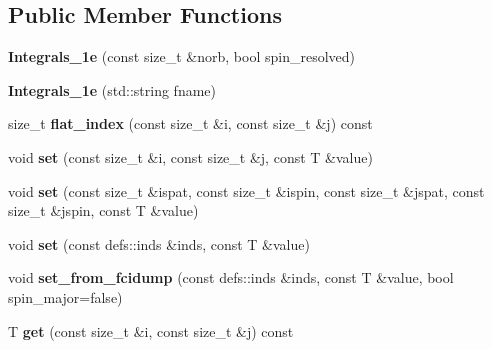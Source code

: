 \subsection*{Public Member Functions}
\begin{DoxyCompactItemize}
\item 
{\bfseries Integrals\+\_\+1e} (const size\+\_\+t \&norb, bool spin\+\_\+resolved)\hypertarget{classIntegrals__1e_a639a4a9f4b1688a96e1d021ad7e38b66}{}\label{classIntegrals__1e_a639a4a9f4b1688a96e1d021ad7e38b66}

\item 
{\bfseries Integrals\+\_\+1e} (std\+::string fname)\hypertarget{classIntegrals__1e_af0f4537e1f148e5c2dbbfc5f252b21a5}{}\label{classIntegrals__1e_af0f4537e1f148e5c2dbbfc5f252b21a5}

\item 
size\+\_\+t {\bfseries flat\+\_\+index} (const size\+\_\+t \&i, const size\+\_\+t \&j) const \hypertarget{classIntegrals__1e_a76f25fd3451dda2ab8c66b7839bc5eb2}{}\label{classIntegrals__1e_a76f25fd3451dda2ab8c66b7839bc5eb2}

\item 
void {\bfseries set} (const size\+\_\+t \&i, const size\+\_\+t \&j, const T \&value)\hypertarget{classIntegrals__1e_a1ef9a0dc53b16eecbe5a0a35cf0a1b90}{}\label{classIntegrals__1e_a1ef9a0dc53b16eecbe5a0a35cf0a1b90}

\item 
void {\bfseries set} (const size\+\_\+t \&ispat, const size\+\_\+t \&ispin, const size\+\_\+t \&jspat, const size\+\_\+t \&jspin, const T \&value)\hypertarget{classIntegrals__1e_a8d84726e57e8b5e9ad5d2b6da38511df}{}\label{classIntegrals__1e_a8d84726e57e8b5e9ad5d2b6da38511df}

\item 
void {\bfseries set} (const defs\+::inds \&inds, const T \&value)\hypertarget{classIntegrals__1e_a29cd675e2ba1b60e45e6190c633d426f}{}\label{classIntegrals__1e_a29cd675e2ba1b60e45e6190c633d426f}

\item 
void {\bfseries set\+\_\+from\+\_\+fcidump} (const defs\+::inds \&inds, const T \&value, bool spin\+\_\+major=false)\hypertarget{classIntegrals__1e_ab5212a1e23d46f82ef84f0cd26d19fae}{}\label{classIntegrals__1e_ab5212a1e23d46f82ef84f0cd26d19fae}

\item 
T {\bfseries get} (const size\+\_\+t \&i, const size\+\_\+t \&j) const \hypertarget{classIntegrals__1e_afb3d94c34ac184d18d378e32068be234}{}\label{classIntegrals__1e_afb3d94c34ac184d18d378e32068be234}


\end{DoxyCompactItemize}
